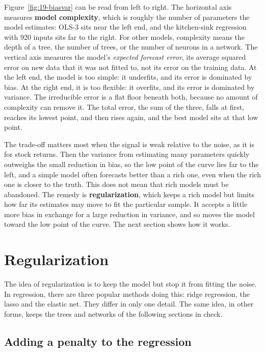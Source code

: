 Figure~\ref{fig:19-biasvar} can be read from left to right. The horizontal axis measures \textbf{model complexity}, which is roughly the number of parameters the model estimates: OLS-3 sits near the left end, and the kitchen-sink regression with 920 inputs sits far to the right. For other models, complexity means the depth of a tree, the number of trees, or the number of neurons in a network. The vertical axis measures the model's \emph{expected forecast error}, its average squared error on new data that it was not fitted to, not its error on the training data. At the left end, the model is too simple: it underfits, and its error is dominated by bias. At the right end, it is too flexible: it overfits, and its error is dominated by variance. The irreducible error is a flat floor beneath both, because no amount of complexity can remove it. The total error, the sum of the three, falls at first, reaches its lowest point, and then rises again, and the best model sits at that low point.

The trade-off matters most when the signal is weak relative to the noise, as it is for stock returns. Then the variance from estimating many parameters quickly outweighs the small reduction in bias, so the low point of the curve lies far to the left, and a simple model often forecasts better than a rich one, even when the rich one is closer to the truth. This does not mean that rich models must be abandoned. The remedy is \textbf{regularization}, which keeps a rich model but limits how far its estimates may move to fit the particular sample. It accepts a little more bias in exchange for a large reduction in variance, and so moves the model toward the low point of the curve. The next section shows how it works.


\section{Regularization}
\label{sec:19-models}
\label{sec:19-shrinkage}

The idea of regularization is to keep the model but stop it from fitting the noise. In regression, there are three popular methods doing this: ridge regression, the lasso and the elastic net. They differ in only one detail. The same idea, in other forms, keeps the trees and networks of the following sections in check.

\subsection{Adding a penalty to the regression}

